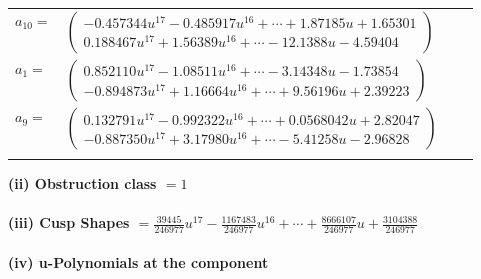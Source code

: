 \documentclass[1p]{elsarticle_modified}
\theoremstyle{definition}
\begin{document}
\begin{tabular}{m{7pt} m{180pt} m{7pt} m{180pt} }
\flushright $a_{10}=$&$\begin{pmatrix}-0.457344 u^{17}-0.485917 u^{16}+\cdots+1.87185 u+1.65301\\0.188467 u^{17}+1.56389 u^{16}+\cdots-12.1388 u-4.59404\end{pmatrix}$ \\
\flushright $a_{1}=$&$\begin{pmatrix}0.852110 u^{17}-1.08511 u^{16}+\cdots-3.14348 u-1.73854\\-0.894873 u^{17}+1.16664 u^{16}+\cdots+9.56196 u+2.39223\end{pmatrix}$ \\
\flushright $a_{9}=$&$\begin{pmatrix}0.132791 u^{17}-0.992322 u^{16}+\cdots+0.0568042 u+2.82047\\-0.887350 u^{17}+3.17980 u^{16}+\cdots-5.41258 u-2.96828\end{pmatrix}$\\&\end{tabular}
\flushleft \textbf{(ii) Obstruction class $= 1$}\\~\\
\flushleft \textbf{(iii) Cusp Shapes $= \frac{39445}{246977} u^{17}-\frac{1167483}{246977} u^{16}+\cdots+\frac{8666107}{246977} u+\frac{3104388}{246977}$}\\~\\
\newpage\renewcommand{\arraystretch}{1}
\flushleft \textbf{(iv) u-Polynomials at the component}\newline \\
\end{document}
